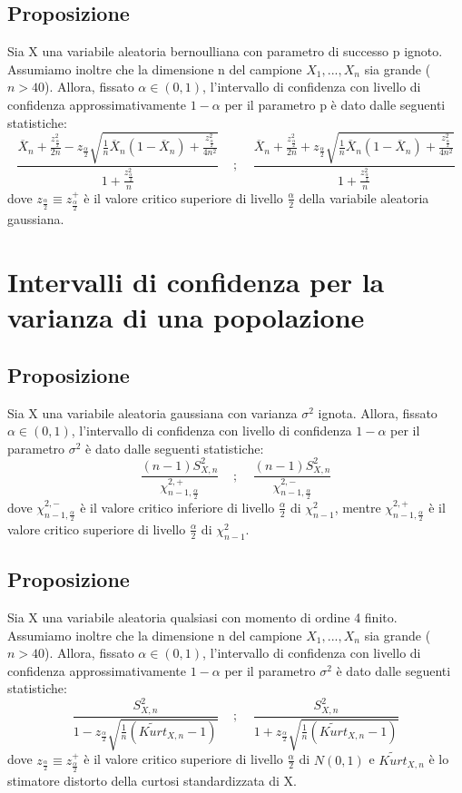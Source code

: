 \documentclass{article}
\begin{document}
\subsection*{Proposizione}
Sia X una variabile aleatoria bernoulliana con parametro di successo p ignoto. Assumiamo inoltre che la dimensione n del campione $X_{1},...,X_{n}$ sia grande ($n>40$). Allora, fissato $\alpha \in (0,1)$, l'intervallo di confidenza con livello di confidenza approssimativamente $1-\alpha$ per il parametro p è dato dalle seguenti statistiche:
\[ \frac{\overline{X}_{n} + \frac{z_{\frac{\alpha}{2}}^{2}}{2n} - z_{\frac{\alpha}{2}}\sqrt{\frac{1}{n}\overline{X}_{n}(1-\overline{X}_{n}) + \frac{z_{\frac{\alpha}{2}}^{2}}{4n^{2}}}}{1+\frac{z_{\frac{\alpha}{2}}^{2}}{n}} \; \; \; \; ; \; \; \; \; \frac{\overline{X}_{n} + \frac{z_{\frac{\alpha}{2}}^{2}}{2n} + z_{\frac{\alpha}{2}}\sqrt{\frac{1}{n}\overline{X}_{n}(1-\overline{X}_{n}) + \frac{z_{\frac{\alpha}{2}}^{2}}{4n^{2}}}}{1+\frac{z_{\frac{\alpha}{2}}^{2}}{n}} \]
dove $z_{\frac{\alpha}{2}} \equiv z_{\frac{\alpha}{2}}^{+}$ è il valore critico superiore di livello $\frac{\alpha}{2}$ della variabile aleatoria gaussiana.

\section*{Intervalli di confidenza per la varianza di una popolazione}
\subsection*{Proposizione}
Sia X una variabile aleatoria gaussiana con varianza $\sigma^{2}$ ignota. Allora, fissato $\alpha \in (0,1)$, l'intervallo di confidenza con livello di confidenza $1-\alpha$ per il parametro $\sigma^{2}$ è dato dalle seguenti statistiche:
\[ \frac{(n-1)S_{X,n}^{2}}{\chi_{n-1,\frac{\alpha}{2}}^{2,+}} \; \; \; \; ; \; \; \; \; \frac{(n-1)S_{X,n}^{2}}{\chi_{n-1,\frac{\alpha}{2}}^{2,-}} \]
dove $\chi_{n-1,\frac{\alpha}{2}}^{2,-}$ è il valore critico inferiore di livello $\frac{\alpha}{2}$ di $\chi_{n-1}^{2}$, mentre $\chi_{n-1,\frac{\alpha}{2}}^{2,+}$ è il valore critico superiore di livello $\frac{\alpha}{2}$ di $\chi_{n-1}^{2}$.

\subsection*{Proposizione}
Sia X una variabile aleatoria qualsiasi con momento di ordine 4 finito. Assumiamo inoltre che la dimensione n del campione $X_{1},...,X_{n}$ sia grande ($n>40$). Allora, fissato $\alpha \in (0,1)$, l'intervallo di confidenza con livello di confidenza approssimativamente $1-\alpha$ per il parametro $\sigma^{2}$ è dato dalle seguenti statistiche:
\[ \frac{S_{X,n}^{2}}{1-z_{\frac{\alpha}{2}}\sqrt{\frac{1}{n}(\widetilde{Kurt}_{X,n}-1)}} \; \; \; \; ; \; \; \; \; \frac{S_{X,n}^{2}}{1+z_{\frac{\alpha}{2}}\sqrt{\frac{1}{n}(\widetilde{Kurt}_{X,n}-1)}} \]
dove $z_{\frac{\alpha}{2}} \equiv z_{\frac{\alpha}{2}}^{+}$ è il valore critico superiore di livello $\frac{\alpha}{2}$ di $N(0,1)$ e $\widetilde{Kurt}_{X,n}$ è lo stimatore distorto della curtosi standardizzata di X.
\end{document}
